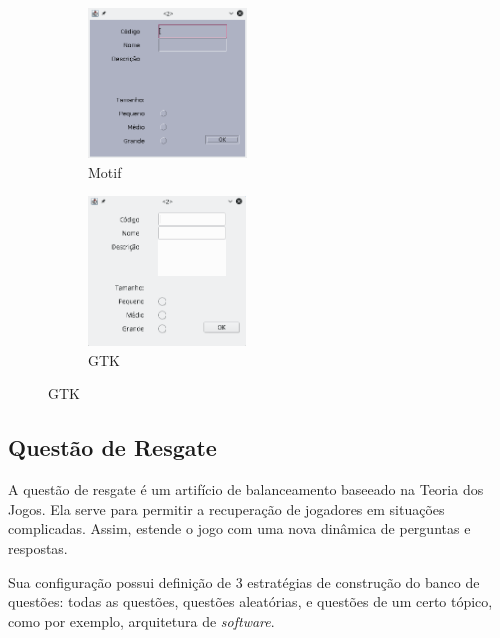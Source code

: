 \documentclass[11pt]{article}
\begin{document}
\begin{figure}[h] \centering
\begin{subfigure}[t]{0.35\textwidth} \centering
\includegraphics[height=150px]{./img/motif.png}
\captionsetup{labelformat=empty} \caption{Motif}
\end{subfigure}
\begin{subfigure}[t]{0.35\textwidth} \centering
\includegraphics[height=150px]{./img/gtk.png}
\captionsetup{labelformat=empty} \caption{GTK}
\end{subfigure}
\end{figure}
\subsection{Questão de Resgate}
\label{sec:org94755c7}
A questão de resgate é um artifício de balanceamento baseeado na Teoria dos Jogos. Ela
serve para permitir a recuperação de jogadores em situações complicadas. Assim,
estende o jogo com uma nova dinâmica de perguntas e respostas.

Sua configuração possui definição de 3 estratégias de construção do banco de questões:
todas as questões, questões aleatórias, e questões de um certo tópico, como por
exemplo, arquitetura de \emph{software}.
\end{document}
